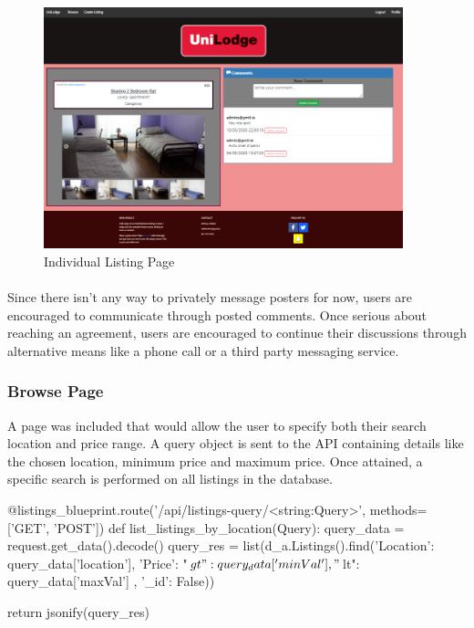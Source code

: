 \begin{figure}[H]
	\caption{Individual Listing Page}
	\label{image:home}
	\centering
	\includegraphics[width=0.93\textwidth]{images/indiv_listing.png}
\end{figure}

\paragraph{}
Since there isn't any way to privately message posters for now, users are encouraged to communicate through posted comments. Once serious about reaching an agreement, users are encouraged to continue their discussions through alternative means like a phone call or a third party messaging service.

\subsubsection{Browse Page}
A page was included that would allow the user to specify both their search location and price range. A query object is sent to the API containing details like the chosen location, minimum price and maximum price. Once attained, a specific search is performed on all listings in the database. \newline

\begin{python}[caption=Querying Specific Listings]
@listings_blueprint.route('/api/listings-query/<string:Query>', methods=['GET', 'POST'])
def list_listings_by_location(Query):
    query_data = request.get_data().decode()
    query_res = list(d_a.Listings().find({'Location': query_data['location'], 'Price': {"$gt": query_data['minVal'], "$lt": query_data['maxVal']} }, {'_id': False}))

    return jsonify(query_res)
\end{python}

